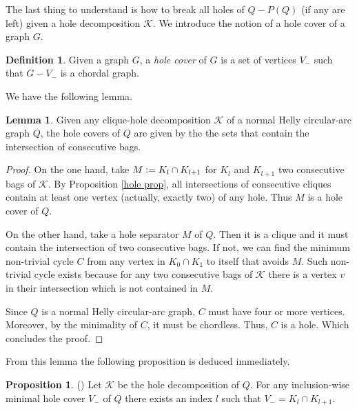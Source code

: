 \documentclass{article}
\theoremstyle{definition}
\newtheorem{prop}[thm]{Proposition}
\newtheorem{lemma}[thm]{Lemma}
\newtheorem{defn}[thm]{Definition}
\newcommand{\defeq}{\vcentcolon=}
\begin{document}
    The last thing to
    understand is how to break
    all holes of $Q - P\left(Q\right)$
    (if any are left)
    given a hole decomposition $\mathcal{K}$.
    We introduce the notion of a
    hole cover of a graph $G$. 

    \begin{defn}
        Given a graph $G$,
        a \emph{hole cover} of
        $G$ is a set of vertices $V_{-}$ 
        such that $G - V_{-}$ is a
        chordal graph.
    \end{defn}

    We have the following lemma.
    
    \begin{lemma}
        Given any clique-hole decomposition
        $\mathcal{K}$ of a normal Helly
        circular-arc graph $Q$, the hole
        covers of $Q$ are given by the
        the sets that contain the intersection
        of consecutive bags.
    \end{lemma}
    \begin{proof}
        On the one hand, take $M \defeq K_{l} \cap K_{l+1}$ 
        for $K_{l}$ and $K_{l+1}$ two consecutive
        bags of $\mathcal{K}$. 
        By Proposition \ref{hole prop},
        all intersections of consecutive
        cliques contain at least one vertex
        (actually, exactly two) of
        any hole.
        Thus $M$ is a hole cover of $Q$.

        On the other hand, take a hole separator
        $M$ of $Q$. Then it is a
        clique and it must contain
        the intersection of two consecutive bags.
        If not, we can find the minimum non-trivial
        cycle $C$ from any vertex in $K_0 \cap K_1$
        to itself that avoids $M$. Such non-trivial
        cycle exists because for any two consecutive
        bags of $\mathcal{K}$ there is a vertex $v$ 
        in their intersection which is not 
        contained in $M$.

        Since $Q$ is a normal Helly circular-arc
        graph, $C$ must have four or more vertices.
        Moreover, by the minimality of $C$, it must be chordless.
        Thus, $C$ is a hole.
        Which concludes the proof.
    \end{proof}
    
    From this lemma the following proposition 
    is deduced immediately.

    \begin{prop} (\cite{main}) \label{cycle prop}
        Let $\mathcal{K}$ be the hole decomposition of
        $Q$. For any
        inclusion-wise 
        minimal hole cover $V_{-}$ of $Q$
        there exists an index $l$ 
        such that $V_{-} = K_{l} \cap K_{l+1}$.
    \end{prop}
\end{document}
